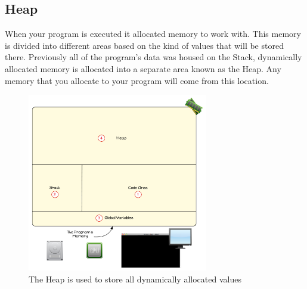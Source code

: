 \subsection{Heap} %
\label{sub:heap}

When your program is executed it allocated memory to work with. This memory is divided into different areas based on the kind of values that will be stored there. Previously all of the program's data was housed on the Stack, dynamically allocated memory is allocated into a separate area known as the Heap. Any memory that you allocate to your program will come from this location.

\begin{figure}[h]
   \centering
   \includegraphics[width=0.7\textwidth]{./topics/dynamic-memory/diagrams/Heap} 
   \caption{The Heap is used to store all dynamically allocated values}
   \label{fig:heap}
\end{figure}

